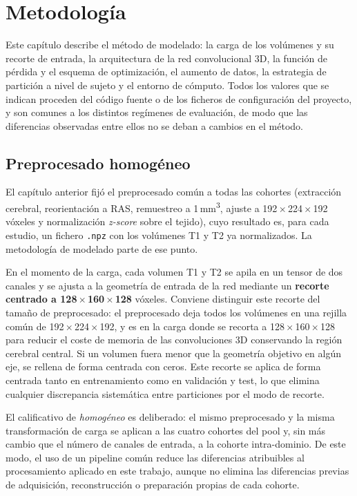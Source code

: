 \chapter{Metodología}

Este capítulo describe el método de modelado: la carga de los volúmenes y su
recorte de entrada, la arquitectura de la red convolucional 3D, la función de
pérdida y el esquema de optimización, el aumento de datos, la estrategia de
partición a nivel de sujeto y el entorno de cómputo. Todos los valores que se
indican proceden del código fuente o de los ficheros de configuración del
proyecto, y son comunes a los distintos regímenes de evaluación, de modo que las
diferencias observadas entre ellos no se deban a cambios en el método.

\section{Preprocesado homogéneo}

El capítulo anterior fijó el preprocesado común a todas las cohortes
(extracción cerebral, reorientación a RAS, remuestreo a 1\,mm\textsuperscript{3},
ajuste a \mbox{192\,$\times$\,224\,$\times$\,192} vóxeles y normalización
\emph{z-score} sobre el tejido), cuyo resultado es, para cada estudio, un fichero
\texttt{.npz} con los volúmenes T1 y T2 ya normalizados. La metodología de
modelado parte de ese punto.

En el momento de la carga, cada volumen T1 y T2 se apila en un tensor de dos
canales y se ajusta a la geometría de entrada de la red mediante un
\textbf{recorte centrado a 128\,$\times$\,160\,$\times$\,128} vóxeles. Conviene
distinguir este recorte del tamaño de preprocesado: el preprocesado deja todos
los volúmenes en una rejilla común de 192\,$\times$\,224\,$\times$\,192, y es en
la carga donde se recorta a 128\,$\times$\,160\,$\times$\,128 para reducir el
coste de memoria de las convoluciones 3D conservando la región cerebral central.
Si un volumen fuera menor que la geometría objetivo en algún eje, se rellena de
forma centrada con ceros. Este recorte se aplica de forma centrada tanto en
entrenamiento como en validación y test, lo que elimina cualquier discrepancia
sistemática entre particiones por el modo de recorte.

El calificativo de \emph{homogéneo} es deliberado: el mismo preprocesado y la
misma transformación de carga se aplican a las cuatro cohortes del pool y, sin
más cambio que el número de canales de entrada, a la cohorte intra-dominio. De
este modo, el uso de un pipeline común reduce las diferencias atribuibles al
procesamiento aplicado en este trabajo, aunque no elimina las diferencias previas
de adquisición, reconstrucción o preparación propias de cada cohorte.

